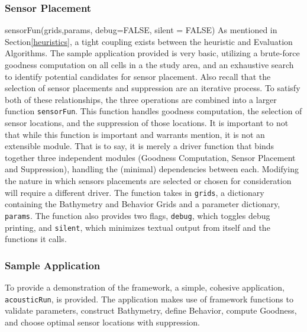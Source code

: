 \subsubsection{Sensor Placement}
sensorFun(grids,params, debug=FALSE, silent = FALSE)
As mentioned in Section\ref{heuristics}, a tight coupling exists between the heuristic and Evaluation Algorithms.  The sample application provided is very basic, utilizing a brute-force goodness computation on all cells in a the study area, and an exhaustive search to identify potential candidates for sensor placement.  Also recall that the selection of sensor placements and suppression are an iterative process.  To satisfy both of these relationships, the three operations are combined into a larger function \texttt{sensorFun}.  This function handles goodness computation, the selection of sensor locations, and the suppression of those locations.  It is important to not that while this function is important and warrants mention, it is not an extensible module.  That is to say, it is merely a driver function that binds together three independent modules (Goodness Computation, Sensor Placement and Suppression), handling the (minimal) dependencies between each.  Modifying the nature in which sensors placements are selected or chosen for consideration will require a different driver.  The  function takes in \texttt{grids}, a dictionary containing the Bathymetry and Behavior Grids and a parameter dictionary, \texttt{params}.  The function also provides two flags, \texttt{debug}, which toggles debug printing, and \texttt{silent}, which minimizes textual output from itself and the functions it calls.


\subsubsection{Sample Application}
To provide a demonstration of the framework, a simple, cohesive application, \texttt{acousticRun}, is provided.  The application makes use of framework functions to validate parameters, construct Bathymetry, define Behavior, compute Goodness, and choose optimal sensor locations with suppression.  

